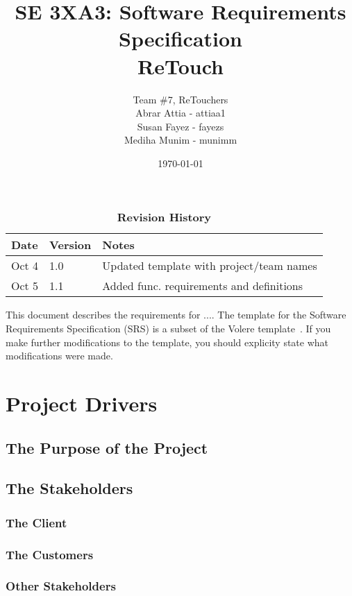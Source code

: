 \documentclass[12pt, titlepage]{article}
\title{SE 3XA3: Software Requirements Specification\\ReTouch}
\author{Team \#7, ReTouchers
		\\ Abrar Attia - attiaa1
		\\ Susan Fayez - fayezs
		\\ Mediha Munim - munimm
}
\date{\today}
\begin{document}
\maketitle

\tableofcontents
\listoftables
\listoffigures

\begin{table}[bp]
\caption{\bf Revision History}
\begin{tabularx}{\textwidth}{p{3cm}p{2cm}X}
\toprule {\bf Date} & {\bf Version} & {\bf Notes}\\
\midrule
Oct 4 & 1.0 & Updated template with project/team names\\
Oct 5 & 1.1 & Added func. requirements and definitions \\
\bottomrule
\end{tabularx}
\end{table}

\newpage


This document describes the requirements for ....  The template for the Software
Requirements Specification (SRS) is a subset of the Volere
template~\citep{RobertsonAndRobertson2012}.  If you make further modifications
to the template, you should explicity state what modifications were made.

\section{Project Drivers}

\subsection{The Purpose of the Project}

\subsection{The Stakeholders}

\subsubsection{The Client}

\subsubsection{The Customers}

\subsubsection{Other Stakeholders}
\end{document}
